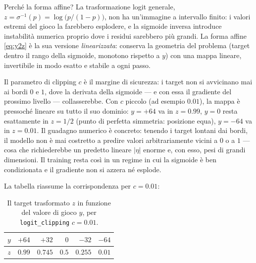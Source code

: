 Perché la forma affine? La trasformazione logit generale,
$z = \sigma^{-1}(p) = \log\bigl(p/(1-p)\bigr)$, non ha un'immagine a
intervallo finito: i valori estremi del gioco la farebbero esplodere, e la
sigmoide inversa introduce instabilità numerica proprio dove i residui
sarebbero più grandi. La forma affine \eqref{eq:y2z} è la sua versione
\emph{linearizzata}: conserva la geometria del problema (target dentro il
rango della sigmoide, monotono rispetto a $y$) con una mappa lineare,
invertibile in modo esatto e stabile a ogni passo.

Il parametro di clipping $c$ è il margine di sicurezza: i target
non si avvicinano mai ai bordi $0$ e $1$, dove la derivata della sigmoide —
e con essa il gradiente del prossimo livello — collasserebbe. Con $c$ piccolo
(ad esempio $0.01$), la mappa è pressoché lineare su tutto il suo dominio:
$y = +64$ va in $z = 0{.}99$, $y = 0$ resta esattamente in $z = 1/2$
(punto di perfetta simmetria: posizione equa), $y = -64$ va in $z = 0{.}01$.
Il guadagno numerico è concreto: tenendo i target lontani dai bordi, il
modello non è mai costretto a predire valori arbitrariamente vicini a $0$ o a
$1$ — cosa che richiederebbe un predetto lineare $|\eta|$ enorme e, con
esso, pesi di grandi dimensioni. Il training resta così in un regime in cui
la sigmoide è ben condizionata e il gradiente non si azzera né esplode.

La tabella riassume la corrispondenza per $c = 0.01$:

\begin{table}[htbp]
\centering
\small
\begin{tabular}{rrrrrr}
\toprule
$y$ & $+64$ & $+32$ & $0$ & $-32$ & $-64$ \\
\midrule
$z$ & $0.99$ & $0.745$ & $0.5$ & $0.255$ & $0.01$ \\
\bottomrule
\end{tabular}
\caption{Il target trasformato $z$ in funzione del valore di gioco $y$, per
\texttt{logit\_clipping} $c = 0.01$.}
\label{tab:zed-esempio}
\end{table}

